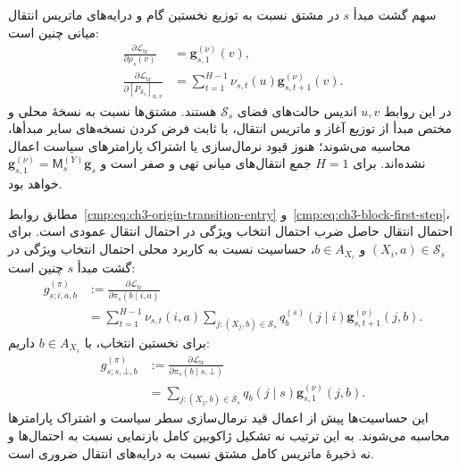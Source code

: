 سهم گشت مبدأ $s$ در مشتق نسبت به توزیع نخستین
گام و درایه‌های ماتریس انتقال میانی چنین است:
\begin{equation}\label{cmp:eq:ch3-gradient-walk-transition}
\boxed{\begin{aligned}
\frac{\partial\mathcal L_{\mathrm{tr}}}{\partial\rho_s(v)}
&=\mathbf g_{s,1}^{(\nu)}(v),\\
\frac{\partial\mathcal L_{\mathrm{tr}}}
{\partial[P_{\mathcal S_s}]_{u,v}}
&=\sum_{t=1}^{H-1}\nu_{s,t}(u)
\mathbf g_{s,t+1}^{(\nu)}(v).
\end{aligned}}
\end{equation}
در این روابط $u,v$ اندیس حالت‌های فضای
$\mathcal S_s$ هستند. مشتق‌ها نسبت به نسخهٔ
محلی و مختص مبدأ از توزیع آغاز و ماتریس انتقال،
با ثابت فرض کردن نسخه‌های سایر مبدأها، محاسبه
می‌شوند؛ هنوز قیود نرمال‌سازی یا اشتراک
پارامترهای سیاست اعمال نشده‌اند.
برای $H=1$ جمع انتقال‌های میانی تهی و صفر است
و $\mathbf g_{s,1}^{(\nu)}
=\mathsf M_s^{(Y)}\mathbf g_s$ خواهد بود.

مطابق روابط~\eqref{cmp:eq:ch3-origin-transition-entry}
و~\eqref{cmp:eq:ch3-block-first-step}، احتمال انتقال
حاصل ضرب احتمال انتخاب ویژگی در احتمال انتقال
عمودی است. برای $(X_i,a)\in\mathcal S_s$ و
$b\in A_{X_i}$، حساسیت نسبت به کاربرد محلی
احتمال انتخاب ویژگی در گشت مبدأ $s$ چنین است:
\begin{equation}\label{cmp:eq:ch3-gradient-local-policy-middle}
\boxed{\begin{aligned}
g_{s;i,a,b}^{(\pi)}
&:=\frac{\partial\mathcal L_{\mathrm{tr}}}
{\partial\pi_s(b\mid i,a)}\\
&=\sum_{t=1}^{H-1}\nu_{s,t}(i,a)
\sum_{j:(X_j,b)\in\mathcal S_s}
q_b^{(s)}(j\mid i)\mathbf g_{s,t+1}^{(\nu)}(j,b).
\end{aligned}}
\end{equation}
برای نخستین انتخاب، با $b\in A_{X_s}$ داریم:
\begin{equation}\label{cmp:eq:ch3-gradient-local-policy-start}
\boxed{\begin{aligned}
g_{s;s,\bot,b}^{(\pi)}
&:=\frac{\partial\mathcal L_{\mathrm{tr}}}
{\partial\pi_s(b\mid s,\bot)}\\
&=\sum_{j:(X_j,b)\in\mathcal S_s}
q_b(j\mid s)\mathbf g_{s,1}^{(\nu)}(j,b).
\end{aligned}}
\end{equation}
این حساسیت‌ها پیش از اعمال قید نرمال‌سازی
سطر سیاست و اشتراک پارامترها محاسبه می‌شوند.
به این ترتیب نه تشکیل ژاکوبین کامل بازنمایی
نسبت به احتمال‌ها و نه ذخیرهٔ ماتریس کامل مشتق
نسبت به درایه‌های انتقال ضروری است.

